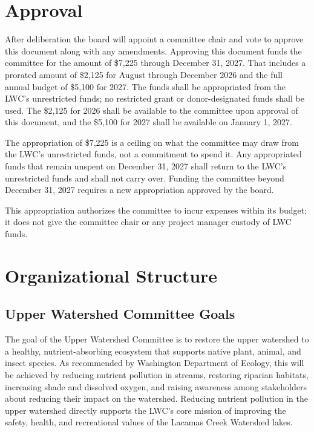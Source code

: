 \documentclass[letterpaper,11pt,leqno]{article}
\begin{document}
\section{Approval}\label{s:approval}
After deliberation the board will appoint a committee chair and vote to approve this document along with any amendments. Approving this document funds the committee for the amount of \$7,225 through December 31, 2027. That includes a prorated amount of \$2,125 for August through December 2026 and the full annual budget of \$5,100 for 2027. The funds shall be appropriated from the LWC's unrestricted funds; no restricted grant or donor-designated funds shall be used. The \$2,125 for 2026 shall be available to the committee upon approval of this document, and the \$5,100 for 2027 shall be available on January 1, 2027.

The appropriation of \$7,225 is a ceiling on what the committee may draw from the LWC's unrestricted funds, not a commitment to spend it. Any appropriated funds that remain unspent on December 31, 2027 shall return to the LWC's unrestricted funds and shall not carry over. Funding the committee beyond December 31, 2027 requires a new appropriation approved by the board.

This appropriation authorizes the committee to incur expenses within its budget; it does not give the committee chair or any project manager custody of LWC funds.

\section{Organizational Structure}\label{s:org}

\subsection{Upper Watershed Committee Goals}
The goal of the Upper Watershed Committee is to restore the upper watershed to a healthy, nutrient-absorbing ecosystem that supports
native plant, animal, and insect species. As recommended by Washington Department of Ecology, this will be achieved by reducing nutrient pollution in streams, restoring riparian habitats, increasing shade and dissolved oxygen,
and raising awareness among stakeholders about reducing their impact on the watershed. Reducing nutrient pollution in the upper watershed directly supports the LWC's core mission of improving the safety, health, and recreational values of the Lacamas Creek Watershed lakes.
\end{document}
